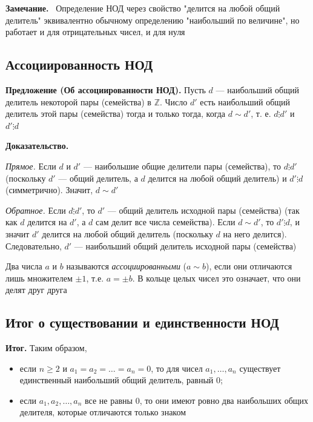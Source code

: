 \documentclass[a4paper,12pt]{article}
\newcommand{\myremark}{\textbf{Замечание.}\ }
\theoremstyle{definition}
\theoremstyle{plain}
\theoremstyle{remark}
\begin{document}
	\myremark
	Определение НОД через свойство "делится на любой общий делитель" эквивалентно обычному определению "наибольший по величине", но работает и для отрицательных чисел, и для нуля
	
	\subsection{Ассоциированность НОД}
	
	\noindent \textbf{Предложение (Об ассоциированности НОД).}
	Пусть $d$ — наибольший общий делитель некоторой пары (семейства) в $\mathbb{Z}$. Число $d'$ есть наибольший общий делитель этой пары (семейства) тогда и только тогда, когда $d \sim d'$, т. е. $d \vdots d'$ и $d' \vdots d$
	
	\medskip
	\noindent \textbf{Доказательство.}
	
	\textit{Прямое.} Если $d$ и $d'$ — наибольшие общие делители пары (семейства), то $d \vdots d'$ (поскольку $d'$ — общий делитель, а $d$ делится на любой общий делитель) и $d' \vdots d$ (симметрично). Значит, $d \sim d'$
	
	\textit{Обратное.} Если $d \vdots d'$, то $d'$ — общий делитель исходной пары (семейства) (так как $d$ делится на $d'$, а $d$ сам делит все числа семейства). Если $d \sim d'$, то $d' \vdots d$, и значит $d'$ делится на любой общий делитель (поскольку $d$ на него делится). Следовательно, $d'$ — наибольший общий делитель исходной пары (семейства)
	
	\begin{tcolorbox}[colback=green!5, colframe=green!50!black, title=Пояснение]
		Два числа $a$ и $b$ называются \textit{ассоциированными} ($a \sim b$), если они отличаются лишь множителем $\pm 1$, т.е. $a = \pm b$. В кольце целых чисел это означает, что они делят друг друга
	\end{tcolorbox}
	
	\subsection{Итог о существовании и единственности НОД}
	
	\noindent \textbf{Итог.}
	Таким образом,
	\begin{itemize}
		\item если $n \geq 2$ и $a_1 = a_2 = \dots = a_n = 0$, то для чисел $a_1, \dots, a_n$ существует единственный наибольший общий делитель, равный $0$;
		\item если $a_1, a_2, \dots, a_n$ все не равны $0$, то они имеют ровно два наибольших общих делителя, которые отличаются только знаком
	\end{itemize}
	
\end{document}
